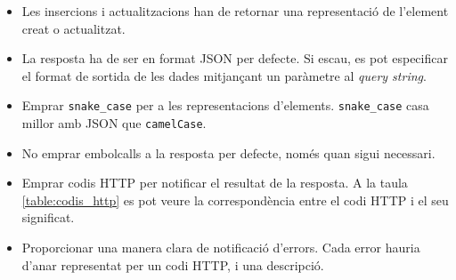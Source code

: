 \begin{itemize}

	\item Les insercions i actualitzacions han de retornar una representació de l'element creat o actualitzat.
	\item La resposta ha de ser en format \ac{JSON} per defecte. Si escau, es pot especificar el format de sortida de les dades mitjançant un paràmetre al \emph{query string}.
	\item Emprar \texttt{snake\_case} per a les representacions d'elements. \texttt{snake\_case} casa millor amb \ac{JSON} que \texttt{camelCase}.
	\item No emprar embolcalls a la resposta per defecte, només quan sigui necessari.
	\item Emprar codis \ac{HTTP} per notificar el resultat de la resposta. A la taula \ref{table:codis_http} es pot veure la correspondència entre el codi \ac{HTTP} i el seu significat.
	\item Proporcionar una manera clara de notificació d'errors. Cada error hauria d'anar representat per un codi \ac{HTTP}, i una descripció.

\end{itemize}
